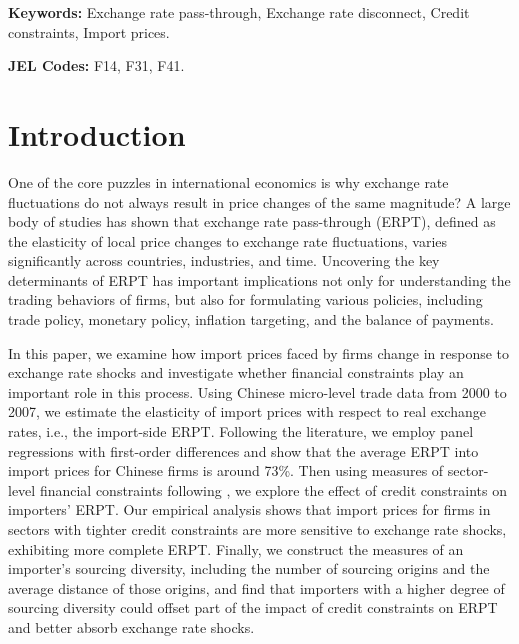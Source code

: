 \textbf{Keywords:} Exchange rate pass-through, Exchange rate disconnect, Credit constraints, Import prices.

\textbf{JEL Codes:} F14, F31, F41.

\newpage

\section{Introduction} \label{Introduction}

One of the core puzzles in international economics \citep{obstfeld2000} is why exchange rate fluctuations do not always result in price changes of the same magnitude? A large body of studies has shown that exchange rate pass-through (ERPT), defined as the elasticity of local price changes to exchange rate fluctuations, varies significantly across countries, industries, and time. Uncovering the key determinants of ERPT has important implications not only for understanding the trading behaviors of firms, but also for formulating various policies, including trade policy, monetary policy, inflation targeting, and the balance of payments. 

In this paper, we examine how import prices faced by firms change in response to exchange rate shocks and investigate whether financial constraints play an important role in this process. Using Chinese micro-level trade data from 2000 to 2007, we estimate the elasticity of import prices with respect to real exchange rates, i.e., the import-side ERPT. Following the literature, we employ panel regressions with first-order differences and show that the average ERPT into import prices for Chinese firms is around 73\%. Then using measures of sector-level financial constraints following \cite{manova-wei-zhang2015}, we explore the effect of credit constraints on importers' ERPT. Our empirical analysis shows that import prices for firms in sectors with tighter credit constraints are more sensitive to exchange rate shocks, exhibiting more complete ERPT. Finally, we construct the measures of an importer's sourcing diversity, including the number of sourcing origins and the average distance of those origins, and find that importers with a higher degree of sourcing diversity could offset part of the impact of credit constraints on ERPT and better absorb exchange rate shocks. 

